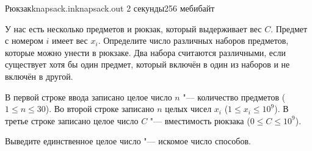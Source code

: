\begin{problem}{Рюкзак}{knapsack.in}{knapsack.out}
{2 секунды}{256 мебибайт}{}

У нас есть несколько предметов и рюкзак, который выдерживает вес $C$. Предмет
с номером $i$ имеет вес $x_i$. Определите число различных наборов предметов,
которые можно унести в рюкзаке. Два набора считаются различными, если
существует хотя бы один предмет, который включён в один из наборов и не
включён в другой.

\InputFile

В первой строке ввода записано целое число $n$ "--- количество предметов
($1 \le n \le 30$). Во второй строке записано $n$ целых чисел $x_i$
($1 \le x_i \le 10^9$). В третье строке записано целое число $C$ "---
вместимость рюкзака ($0 \le C \le 10^9$).

\OutputFile

Выведите единственное целое число "--- искомое число способов.

\Examples
\begin{example}
%
%
%
%
%
%
\end{example}

\end{problem}
